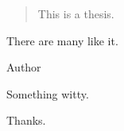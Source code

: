 \begin{abstract}
This is a thesis.
\end{abstract}


\begin{declaration}
There are many like it.

\vspace*{1cm}
\begin{flushright}
Author
\end{flushright}
\end{declaration}


\begin{preface}

Something witty.
\end{preface}

\begin{acknowledgements}
Thanks.

\end{acknowledgements}


\tableofcontents
